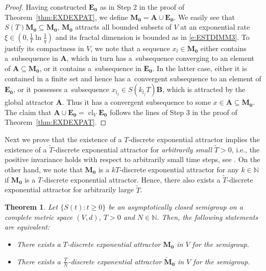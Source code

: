 \documentclass[a4paper,12pt,reqno]{amsart}
\theoremstyle{plain}
\newtheorem{thm}[lem]{Theorem}
\theoremstyle{definition}
\numberwithin{equation}{section}
\newcommand{\N}{\mathbb{N}}
\newcommand{\cl}{\operatorname{cl}}
\renewcommand{\geq}{\geqslant}
\begin{document}
\begin{proof}
Having constructed $\mathbf{E_0}$ as in Step 2 in the proof of Theorem~\ref{thm:EXDEXPAT}, we define $\mathbf{M_0}=\mathbf{A}\cup\mathbf{E_0}$.
We easily see that $S(T)\mathbf{M_0}\subseteq\mathbf{M_0}$, $\mathbf{M_0}$ attracts all bounded subsets of $V$ at an exponential rate $\xi\in(0,\frac{1}{T}\ln\frac{1}{q})$ and its fractal dimension is bounded as in \eqref{e:ESTDIMM3}. To justify its compactness in $V$, we note that a sequence $x_l\in\mathbf{M_0}$ either contains a~subsequence in $\mathbf{A}$, which in turn has a~subsequence converging to an element of $\mathbf{A}\subseteq\mathbf{M_0}$, or it contains a~subsequence in $\mathbf{E_0}$. In the latter case, either it is contained in a finite set and hence has a~convergent subsequence to an element of $\mathbf{E_0}$, or it possesses a~subsequence $x_{l_j}\in S(k_{l_j}T)\mathbf{B}$, which is attracted by the global attractor $\mathbf{A}$. Thus it has a convergent subsequence to some $x\in\mathbf{A}\subseteq\mathbf{M_0}$.
The claim that $\mathbf{A}\cup\mathbf{E_0}=\cl_{V}\mathbf{E_0}$ follows the lines of Step 3 in the proof of Theorem~\ref{thm:EXDEXPAT}. 
\end{proof}

Next we prove that the existence of a $T$-discrete exponential attractor implies the existence of a $\widetilde T$-discrete exponential attractor for  \emph{arbitrarily small} $\widetilde T>0$, i.e., the positive invariance holds with respect to arbitrarily small time steps, see \cite{sonner2012}. On the other hand, we note that $\mathbf{M_0}$ is a $kT$-discrete exponential attractor for any $k\in\mathbb{N}$ if $\mathbf{M_0}$ is a $T$-discrete exponential attractor. Hence, there also exists a $\widetilde T$-discrete exponential attractor for arbitrarily large $\widetilde T$.

\begin{thm}\label{thm:SMALLEXPATTR}
Let $\{S(t)\colon t\geq 0\}$ be an asymptotically closed semigroup on a complete metric space $(V,d)$, $T>0$ 
and $N\in\N$.
Then, the following statements are equivalent:
\begin{itemize}
\item[$(1)$] There exists a $T$-discrete exponential attractor $\mathbf{M_0}$ in $V$ for the semigroup.
\item[$(2)$] There exists a $\frac{T}{N}$-discrete exponential attractor $\mathbf{\widetilde{M}_0}$ in $V$ for the semigroup. 
\end{itemize}
\end{thm}
\end{document}
